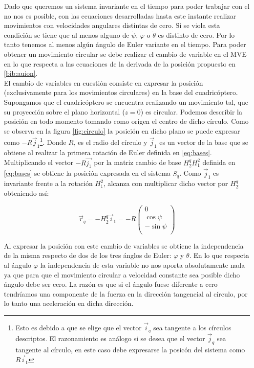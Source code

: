 \documentclass[main]{subfiles}
\begin{document}
Dado que queremos un sistema invariante en el tiempo para poder trabajar con el no nos es posible, con las ecuaciones desarrolladas hasta este instante realizar movimientos con velocidades angulares distintas de cero. Si se viola esta condici\'on se tiene que al menos alguno de $\dot{\psi}$, $\dot{\varphi}$ o $\dot{\theta}$ es distinto de cero. Por lo tanto tenemos al menos alg\'un \'angulo de Euler variante en el tiempo. Para poder obtener un movimiento circular se debe realizar el cambio de variable en el MVE en lo que respecta a las ecuaciones de la derivada de la posici\'on propuesto en \ref{bib:auion}. \\
El cambio de variables en cuesti\'on consiste en expresar la posici\'on (exclusivamente para los movimientos circulares) en la base del cuadric\'optero. Supongamos que el cuadric\'optero se encuentra realizando un movimiento tal, que su proyecci\'on sobre el plano horizontal ($z=0$) es circular. Podemos describir la posici\'on en todo momento tomando como origen el centro de dicho c\'irculo. Como se observa en la figura \ref{fig:circulo} la posici\'on en dicho plano se puede expresar como $-R\vec{j}_1$\footnote{Esto es debido a que se elige que el vector $\vec{i}_q$ sea tangente a los c\'irculos descriptos. El razonamiento es an\'alogo si se desea que el vector $\vec{j}_q$ sea tangente al c\'irculo, en este caso debe expresarse la posic\'on del sistema como $R\vec{i}_1$}. Donde $R$, es el radio del c\'irculo y $\vec{j}_1$ es un vector de la base que se obtiene al realizar la primera rotaci\'on de Euler definida en \ref{eq:bases}. Multiplicando el vector $-R\vec{j_1}$ por la matriz cambio de base $H_2^qH_1^2$ definida en \ref{eq:bases} se obtiene la posici\'on expresada en el sistema $S_q$. Como $\vec{j}_1$ es invariante frente a la rotaci\'on $H_1^2$, alcanza con multiplicar dicho vector por $H_2^q$ obteniendo as\'i:

\begin{equation}
\label{eq:pos_circ}
\vec{r}_q=-H_2^q\vec{i}_1=-R\left(\begin{array}{c}
0\\
\cos\psi\\
-\sin\psi\\
\end{array}\right)
\end{equation}

Al expresar la posici\'on con este cambio de variables se obtiene la independencia de la misma respecto de dos de los tres \'anglos de Euler: $\varphi$ y $\theta$. En lo que respecta al \'angulo $\varphi$ la independencia de esta variable no nos aporta absolutamente nada ya que para que el movimiento circular a velocidad constante sea posible dicho \'angulo debe ser cero. La raz\'on es que si el \'angulo fuese diferente a cero tendr\'iamos una componente de la fuerza en la direcci\'on tangencial al c\'irculo, por lo tanto una aceleraci\'on en dicha direcci\'on.\\
\end{document}
